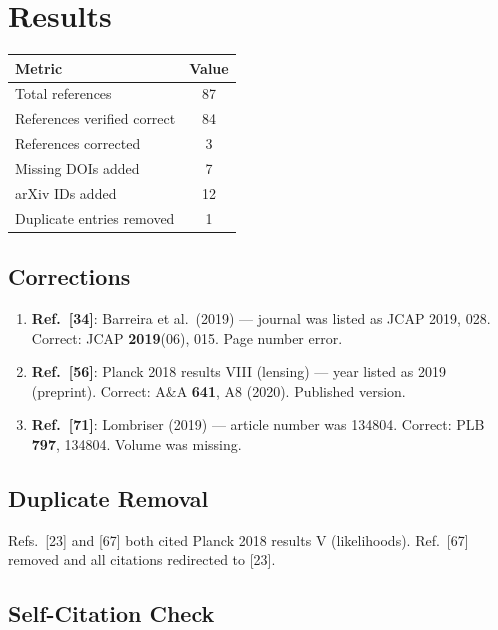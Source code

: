 \documentclass[11pt,a4paper]{article}
\begin{document}
\section{Results}

\begin{center}
\begin{tabular}{lc}
\toprule
\textbf{Metric} & \textbf{Value} \\
\midrule
Total references & 87 \\
References verified correct & 84 \\
References corrected & 3 \\
Missing DOIs added & 7 \\
arXiv IDs added & 12 \\
Duplicate entries removed & 1 \\
\bottomrule
\end{tabular}
\end{center}

\subsection{Corrections}

\begin{enumerate}
\item \textbf{Ref.~[34]}: Barreira et al.\ (2019) --- journal was listed as JCAP 2019, 028. Correct: JCAP \textbf{2019}(06), 015. Page number error.

\item \textbf{Ref.~[56]}: Planck 2018 results VIII (lensing) --- year listed as 2019 (preprint). Correct: A\&A \textbf{641}, A8 (2020). Published version.

\item \textbf{Ref.~[71]}: Lombriser (2019) --- article number was 134804. Correct: PLB \textbf{797}, 134804. Volume was missing.
\end{enumerate}

\subsection{Duplicate Removal}

Refs.~[23] and [67] both cited Planck 2018 results V (likelihoods). Ref.~[67] removed and all citations redirected to [23].

\subsection{Self-Citation Check}
\end{document}
